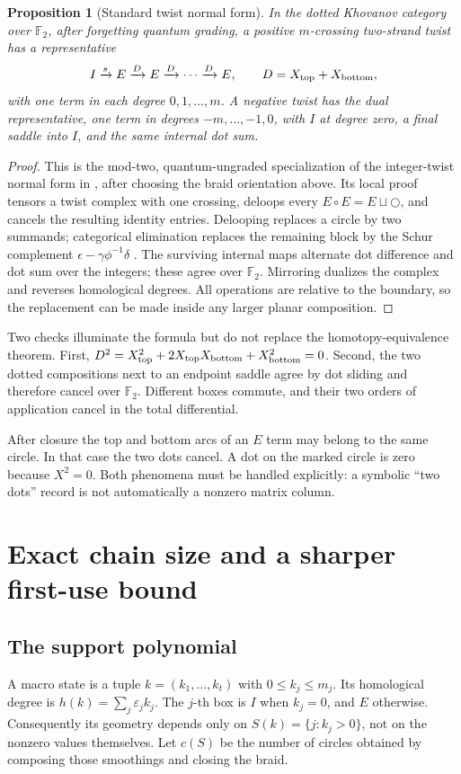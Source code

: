 \documentclass[11pt,letterpaper]{article}
\newtheorem{proposition}[theorem]{Proposition}
\theoremstyle{definition}
\newcommand{\F}{\mathbb F_2}
\newcommand{\eps}{\varepsilon}
\begin{document}
\begin{proposition}[Standard twist normal form]\label{prop:normal}
In the dotted Khovanov category over \(\F\), after forgetting quantum grading, a positive \(m\)-crossing two-strand twist has a representative
\[
 I\xrightarrow{s} E\xrightarrow{D}E\xrightarrow{D}\cdots\xrightarrow{D}E,
 \qquad D=X_{\rm top}+X_{\rm bottom},
\]
with one term in each degree \(0,1,\ldots,m\). A negative twist has the dual representative, one term in degrees \(-m,\ldots,-1,0\), with \(I\) at degree zero, a final saddle into \(I\), and the same internal dot sum.
\end{proposition}
\begin{proof}
This is the mod-two, quantum-ungraded specialization of the integer-twist normal form in \cite[Proposition 4.1]{thompson}, after choosing the braid orientation above. Its local proof tensors a twist complex with one crossing, deloops every \(E\circ E=E\sqcup\bigcirc\), and cancels the resulting identity entries. Delooping replaces a circle by two summands; categorical elimination replaces the remaining block by the Schur complement
\(\epsilon-\gamma\phi^{-1}\delta\) \cite[Lemmas 4.1--4.2]{bn07}.
The surviving internal maps alternate dot difference and dot sum over the integers; these agree over \(\F\). Mirroring dualizes the complex and reverses homological degrees. All operations are relative to the boundary, so the replacement can be made inside any larger planar composition.
\end{proof}

Two checks illuminate the formula but do not replace the homotopy-equivalence theorem. First,
\(D^2=X_{\rm top}^2+2X_{\rm top}X_{\rm bottom}+X_{\rm bottom}^2=0\).
Second, the two dotted compositions next to an endpoint saddle agree by dot sliding and therefore cancel over \(\F\). Different boxes commute, and their two orders of application cancel in the total differential.

After closure the top and bottom arcs of an \(E\) term may belong to the same circle. In that case the two dots cancel. A dot on the marked circle is zero because \(X^2=0\). Both phenomena must be handled explicitly: a symbolic ``two dots'' record is not automatically a nonzero matrix column.

\section{Exact chain size and a sharper first-use bound}\label{sec:count}
\subsection{The support polynomial}
A macro state is a tuple
\(k=(k_1,\ldots,k_t)\) with \(0\leq k_j\leq m_j\).
Its homological degree is \(h(k)=\sum_j\eps_jk_j\).
The \(j\)-th box is \(I\) when \(k_j=0\), and \(E\) otherwise. Consequently its geometry depends only on
\(S(k)=\{j:k_j>0\}\), not on the nonzero values themselves.
Let \(c(S)\) be the number of circles obtained by composing those smoothings and closing the braid.
\end{document}
